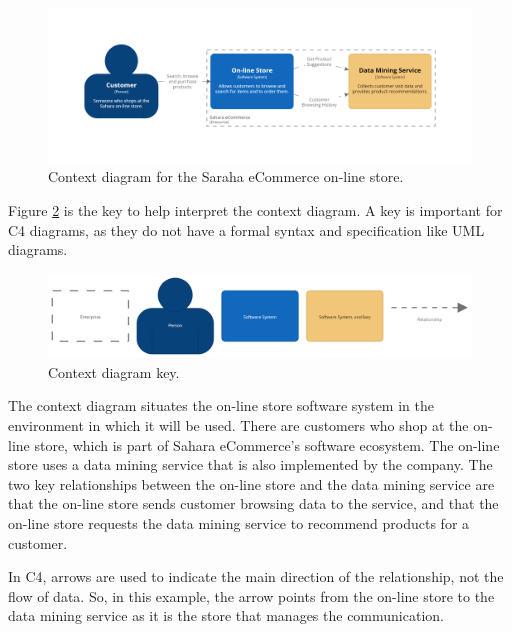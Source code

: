 \begin{figure}[h]
    \centering
    \includegraphics[trim=195 195 198 195,clip,width=\textwidth]{images/c4/context_diagram.png}
    \caption{Context diagram for the Saraha eCommerce on-line store.}
    \label{fig:c4_context}
\end{figure}

\noindent
Figure \ref{fig:c4_context_key} is the key to help interpret the context diagram.
A key is important for C4 diagrams, as they do not have a formal syntax and specification like UML diagrams.

\begin{figure}[h!]
    \centering
    \begin{adjustwidth}{-7.5mm}{-7.5mm}
        \includegraphics[trim=20 15 20 18,clip,width=0.95\paperwidth]{images/c4/context_diagram-key.png}
    \end{adjustwidth}
    \caption{Context diagram key.}
    \label{fig:c4_context_key}
\end{figure}

\noindent
The context diagram situates the on-line store software system in the environment in which it will be used.
There are customers who shop at the on-line store, which is part of Sahara eCommerce's software ecosystem.
The on-line store uses a data mining service that is also implemented by the company.
The two key relationships between the on-line store and the data mining service are 
that the on-line store sends customer browsing data to the service,
and that the on-line store requests the data mining service to recommend products for a customer.

In C4, arrows are used to indicate the main direction of the relationship, not the flow of data.
So, in this example, the arrow points from the on-line store to the data mining service as it is the store that manages the communication.

